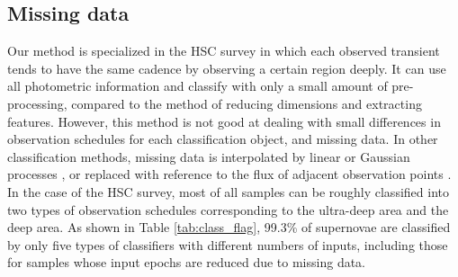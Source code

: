 \documentclass[useamsfonts]{pasj01}
\begin{document}
\subsection{Missing data}
%
Our method is specialized in the HSC survey in which each observed transient tends to have the same cadence by observing a certain region deeply.
It can use all photometric information and classify with only a small amount of pre-processing, compared to the method of reducing dimensions and extracting features. 
However, this method is not good at dealing with small differences in observation schedules for each classification object, and missing data.
In other classification methods, missing data is interpolated by linear or Gaussian processes \citep{lockner16a,Muthukrishna_2019}, or replaced with reference to the flux of adjacent observation points \citep{charnock17a}.
In the case of the HSC survey, most of all samples can be roughly classified into two types of observation schedules corresponding to the ultra-deep area and the deep area.
As shown in Table \ref{tab:class_flag}, 99.3\% of supernovae are classified by only five types of classifiers with different numbers of inputs, including those for samples whose input epochs are reduced due to missing data.
%
\end{document}

